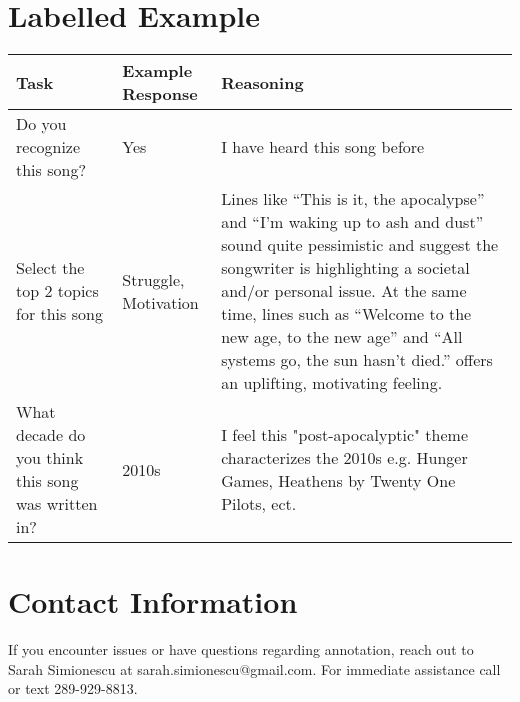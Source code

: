 \documentclass{article}
\begin{document}
\section{Labelled Example}
\begin{tabular}{p{}|p{}|p{}}
\toprule
\textbf{Task} & \textbf{Example Response} & \textbf{Reasoning} \\
\midrule
Do you recognize this song? & Yes & I have heard this song before \\
\midrule
Select the top 2 topics for this song & Struggle, Motivation & Lines like ``This is it, the apocalypse'' and ``I'm waking up to ash and dust'' sound quite pessimistic and suggest the songwriter is highlighting a societal and/or personal issue. At the same time, lines such as ``Welcome to the new age, to the new age'' and ``All systems go, the sun hasn't died.'' offers an uplifting, motivating feeling. \\
\midrule
What decade do you think this song was written in? & 2010s &  I feel this "post-apocalyptic" theme characterizes the 2010s e.g. Hunger Games, Heathens by Twenty One Pilots, ect. \\
\bottomrule
\end{tabular}

\section{Contact Information}
If you encounter issues or have questions regarding annotation, reach out to Sarah Simionescu at sarah.simionescu@gmail.com. For immediate assistance call or text 289-929-8813.
\end{document}

